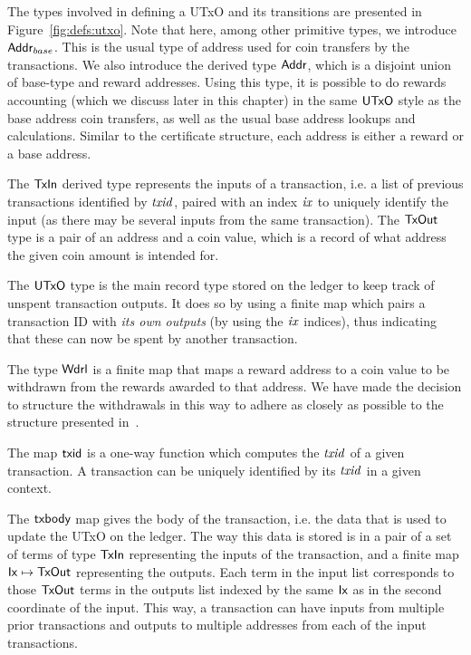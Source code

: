 \documentclass[11pt,a4paper,dvipsnames]{article}
\newcommand{\Ix}{\type{Ix}}
\newcommand{\Addr}{\type{Addr}}
\newcommand{\UTxO}{\type{UTxO}}
\newcommand{\Wdrl}{\type{Wdrl}}
\newcommand{\TxIn}{\type{TxIn}}
\newcommand{\TxOut}{\type{TxOut}}
\theoremstyle{definition}
\theoremstyle{definition}
\begin{document}
The types involved in defining a UTxO and its transitions are presented in
Figure~\ref{fig:defs:utxo}. Note that here, among other primitive types,
we introduce $\Addr_{base}$. This is the usual type of address used for
coin transfers by the transactions. We also introduce the derived type $\Addr$,
which is a disjoint union of base-type and reward addresses. Using this type,
it is possible to do rewards accounting (which we discuss later in this chapter)
in the same $\UTxO$ style as the base address coin transfers, as well as
the usual base address lookups and calculations.
Similar to the certificate structure, each address is either a reward or a base
address.

The $\TxIn$ derived type represents the inputs of a transaction, i.e. a list of
previous transactions identified by $\mathit{txid}$, paired with an index
$\mathit{ix}$ to
uniquely identify the input (as there may be several inputs from the same
transaction). The $\TxOut$ type is a pair of an address and a coin value,
which is a record of what address the given coin amount is intended for.

The $\UTxO$ type is the main record type stored on the ledger to keep track of
unspent transaction outputs. It does so by using a finite map which pairs
a transaction ID with \textit{its own outputs} (by using the $\mathit{ix}$ indices),
thus indicating that these
can now be spent by another transaction.

The type $\Wdrl$ is a finite map that maps a reward address to a coin value to
be withdrawn from the rewards awarded to that address. We have made the decision
to structure the withdrawals in this way to adhere as closely as possible
to the structure presented in~\cite{chimeric}.

The map $\mathsf{txid}$ is a one-way function which computes the $\mathit{txid}$
of a given transaction. A transaction can be uniquely identified
by its $\mathit{txid}$ in a given context.

The $\mathsf{txbody}$ map gives the body of the transaction, i.e. the data that is
used to update the UTxO on the ledger. The way this data is stored is in
a pair of a set of terms of type $\TxIn$ representing the inputs of the
transaction, and a finite map $\Ix \mapsto \TxOut$ representing the outputs.
Each term in the input list
corresponds to those $\TxOut$ terms in the outputs list indexed by the same
$\Ix$ as in the second coordinate of the input. This way, a transaction can have
inputs from multiple prior transactions and outputs to multiple addresses
from each of the input transactions.
\end{document}
